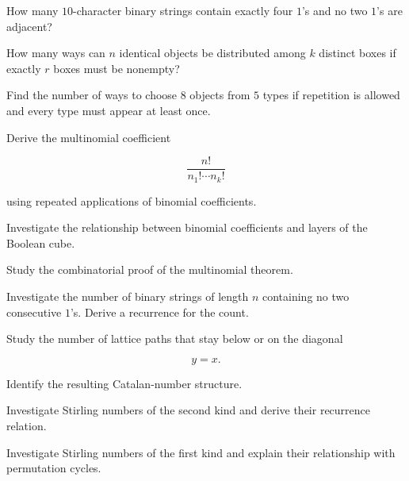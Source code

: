 \begin{exercise}[3]
How many \(10\)-character binary strings contain exactly four \(1\)'s
and no two \(1\)'s are adjacent?
\end{exercise}

\begin{exercise}[3]
How many ways can \(n\) identical objects be distributed among \(k\)
distinct boxes if exactly \(r\) boxes must be nonempty?
\end{exercise}

\begin{exercise}[3]
Find the number of ways to choose \(8\) objects from \(5\) types if
repetition is allowed and every type must appear at least once.
\end{exercise}

\begin{exercise}[3]
Derive the multinomial coefficient

\[
\frac{n!}{n_1!\cdots n_k!}
\]

using repeated applications of binomial coefficients.
\end{exercise}

\begin{exercise}[4]
Investigate the relationship between binomial coefficients and layers
of the Boolean cube.
\end{exercise}

\begin{exercise}[4]
Study the combinatorial proof of the multinomial theorem.
\end{exercise}

\begin{exercise}[4]
Investigate the number of binary strings of length \(n\) containing no
two consecutive \(1\)'s. Derive a recurrence for the count.
\end{exercise}

\begin{exercise}[4]
Study the number of lattice paths that stay below or on the diagonal

\[
y=x.
\]

Identify the resulting Catalan-number structure.
\end{exercise}

\begin{exercise}[4]
Investigate Stirling numbers of the second kind and derive their
recurrence relation.
\end{exercise}

\begin{exercise}[4]
Investigate Stirling numbers of the first kind and explain their
relationship with permutation cycles.
\end{exercise}

